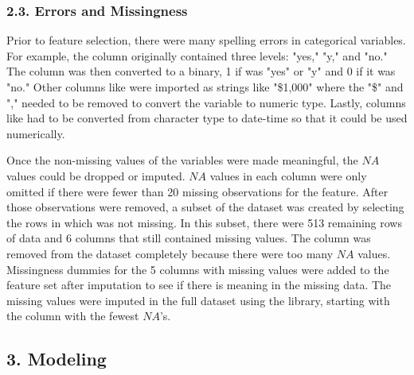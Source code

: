 \documentclass[12pt]{article}
\begin{document}
\subsubsection*{2.3. Errors and Missingness}


Prior to feature selection, there were many spelling errors in categorical variables. For example, the  column originally contained three levels: "yes," "y," and "no." The column was then converted to a binary, 1 if  was "yes" or "y" and 0 if it was "no." Other columns like  were imported as strings like "\$1,000" where the "\$" and "," needed to be removed to convert the variable to numeric type. Lastly, columns like  had to be converted from character type to date-time so that it could be used numerically.

Once the non-missing values of the variables were made meaningful, the $NA$ values could be dropped or imputed. $NA$ values in each column were only omitted if there were fewer than 20 missing observations for the feature. After those observations were removed, a subset of the dataset was created by selecting the rows in which  was not missing. In this subset, there were 513 remaining rows of data and 6 columns that still contained missing values. The  column was removed from the dataset completely because there were too many $NA$ values. Missingness dummies for the 5 columns with missing values were added to the feature set after imputation to see if there is meaning in the missing data. The missing values were imputed in the full dataset using the  library, starting with the column with the fewest $NA$'s.

\subsection*{3. Modeling}

\end{document}

